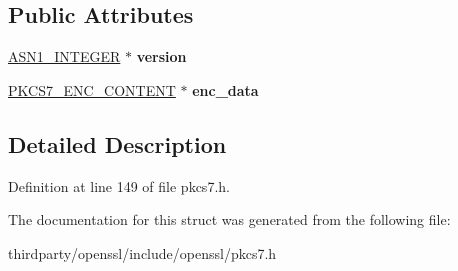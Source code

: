 \subsection*{Public Attributes}
\begin{DoxyCompactItemize}
\item 
\mbox{\label{structpkcs7__signedandenveloped__st_afa74cdf71197c1a7cdc53b1ee662802c}} 
\hyperlink{structasn1__string__st}{A\+S\+N1\+\_\+\+I\+N\+T\+E\+G\+ER} $\ast$ {\bfseries version}
\item 
\mbox{\label{structpkcs7__signedandenveloped__st_a13b7235eaaab4212ab646d69c10c8012}} 
\hyperlink{structpkcs7__enc__content__st}{P\+K\+C\+S7\+\_\+\+E\+N\+C\+\_\+\+C\+O\+N\+T\+E\+NT} $\ast$ {\bfseries enc\+\_\+data}
\end{DoxyCompactItemize}


\subsection{Detailed Description}


Definition at line 149 of file pkcs7.\+h.



The documentation for this struct was generated from the following file\+:\begin{DoxyCompactItemize}
\item 
thirdparty/openssl/include/openssl/pkcs7.\+h\end{DoxyCompactItemize}

